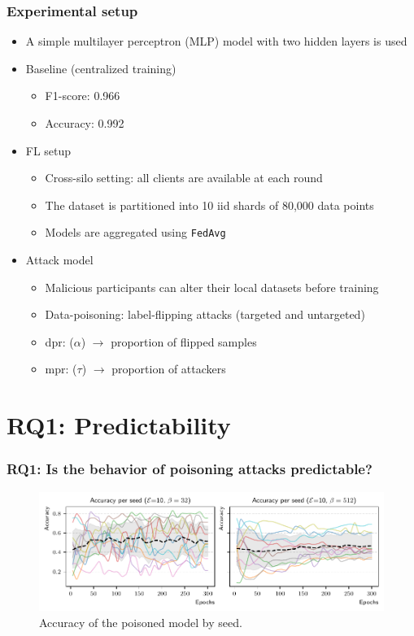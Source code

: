 \documentclass[color,t,presentation,english,aspectratio=169]{beamer}
\begin{document}
\begin{frame}
\frametitle{Experimental setup}
\begin{itemize}
    \item A simple multilayer perceptron (MLP) model with two hidden layers is used
    \item Baseline (centralized training)
    \begin{itemize}
        \item F1-score: 0.966
        \item Accuracy: 0.992
    \end{itemize}
    \item FL setup
    \begin{itemize}
        \item Cross-silo setting: all clients are available at each round
        \item The dataset is partitioned into 10 \gls{iid} shards of 80,000 data points
        \item Models are aggregated using \texttt{FedAvg}
    \end{itemize}
    \item Attack model
    \begin{itemize}
        \item Malicious participants can alter their local datasets before training
        \item Data-poisoning: label-flipping attacks (targeted and untargeted)
        \item \Gls{dpr}: ($\alpha$) $\rightarrow$ proportion of flipped samples
        \item \Gls{mpr}: ($\tau$) $\rightarrow$ proportion of attackers
    \end{itemize}
\end{itemize}
\end{frame}

\section{RQ1: Predictability}

\begin{frame}
\frametitle{RQ1: Is the behavior of poisoning attacks predictable?}
\begin{figure}
	\centering
	\includegraphics[width=.8\textwidth]{figures/predictability-all.pdf}
	\caption{Accuracy of the poisoned model by seed.}
\end{figure}
\end{frame}
\end{document}
